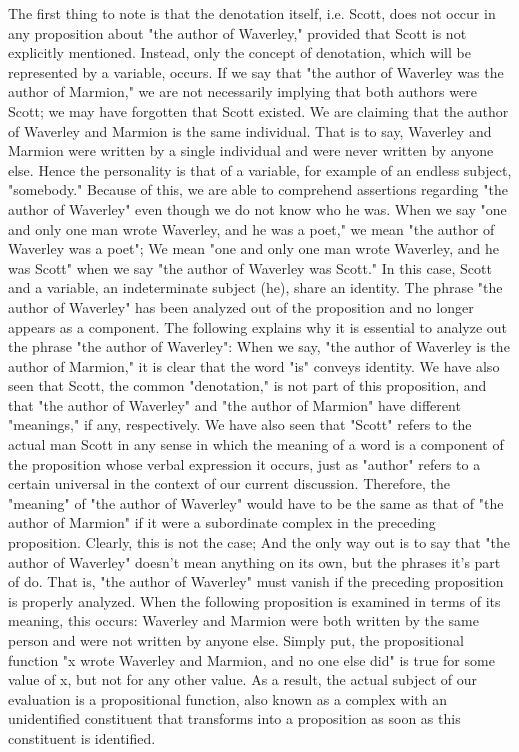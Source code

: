 \documentclass[a4paper,12pt]{book}[2004/02/16]
\theoremstyle{ilemma}
\theoremstyle{itheorem}
\theoremstyle{iother}
\theoremstyle{icorollary}
\theoremstyle{numcorollary}
\theoremstyle{idefinition}
\begin{document}
The first thing to note is that the denotation itself, i.e. Scott, does not occur in any proposition about "the author of Waverley," provided that Scott is not explicitly mentioned. Instead, only the concept of denotation, which will be represented by a variable, occurs. If we say that "the author of Waverley was the author of Marmion," we are not necessarily implying that both authors were Scott; we may have forgotten that Scott existed. We are claiming that the author of Waverley and Marmion is the same individual. That is to say, Waverley and Marmion were written by a single individual and were never written by anyone else. Hence the personality is that of a variable, for example of an
endless subject, "somebody." Because of this, we are able to comprehend assertions regarding "the author of Waverley" even though we do not know who he was. When we say "one and only one man wrote Waverley, and he was a poet," we mean "the author of Waverley was a poet"; We mean "one and only one man wrote Waverley, and he was Scott" when we say "the author of Waverley was Scott." In this case, Scott and a variable, an indeterminate subject (he), share an identity. The phrase "the author of Waverley" has been analyzed out of the proposition and no longer appears as a component. The following explains why it is essential to analyze out the phrase "the author of Waverley": When we say, "the author of Waverley is the author of Marmion," it is clear that the word "is" conveys identity. We have also seen that Scott, the common "denotation," is not part of this proposition, and that "the author of Waverley" and "the author of Marmion" have different "meanings," if any, respectively. We have also seen that "Scott" refers to the actual man Scott in any sense in which the meaning of a word is a component of the proposition whose verbal expression it occurs, just as "author" refers to a certain universal in the context of our current discussion. Therefore, the "meaning" of "the author of Waverley" would have to be the same as that of "the author of Marmion" if it were a subordinate complex in the preceding proposition. Clearly, this is not the case; And the only way out is to say that "the author of Waverley" doesn't mean anything on its own, but the phrases it's part of do.
That is, "the author of Waverley" must vanish if the preceding proposition is properly analyzed. When the following proposition is examined in terms of its meaning, this occurs: Waverley and Marmion were both written by the same person and were not written by anyone else. Simply put, the propositional function "x wrote Waverley and Marmion, and no one else did" is true for some value of x, but not for any other value. As a result, the actual subject of our evaluation is a propositional function, also known as a complex with an unidentified constituent that transforms into a proposition as soon as this constituent is identified.
\end{document}
